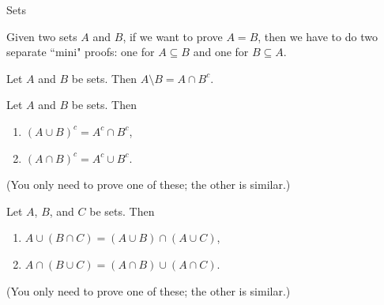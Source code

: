 \begin{section}{Sets}
\begin{remark}
Given two sets $A$ and $B$, if we want to prove $A=B$, then we have to do two separate ``mini" proofs: one for $A\subseteq B$ and one for $B\subseteq A$.
\end{remark}

\begin{theorem}[*]
Let $A$ and $B$ be sets.  Then $A\setminus B = A \cap B^c$.
\end{theorem}

\begin{theorem}
Let $A$ and $B$ be sets. Then 
\begin{enumerate}
\item $(A \cup B)^c = A^c \cap B^c$,
\item $(A \cap B)^c = A^c \cup B^c$.
\end{enumerate}
(You only need to prove one of these; the other is similar.)
\end{theorem}

\begin{theorem}
Let $A$, $B$, and $C$ be sets. Then
\begin{enumerate}
\item $A \cup(B\cap C) = (A\cup B)\cap (A\cup C)$,
\item $A\cap (B\cup C)= (A\cap B)\cup (A\cap C)$.
\end{enumerate}
(You only need to prove one of these; the other is similar.)
\end{theorem}

\end{section}

